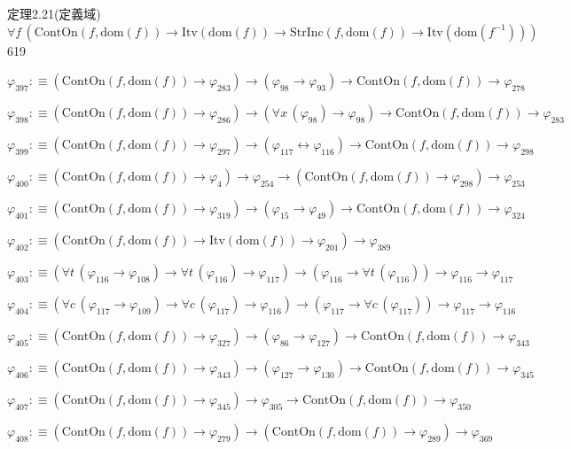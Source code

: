 \begin{fullproof}{定理2.21(定義域)}{$\forall f\,(\mathrm{ContOn}(f,\mathrm{dom}(f)) \to \mathrm{Itv}(\mathrm{dom}(f)) \to \mathrm{StrInc}(f,\mathrm{dom}(f)) \to \mathrm{Itv}(\mathrm{dom}(f^{-1})))$}{619}
\begin{abbrevlist}
\item $\varphi_{397} :\equiv (\mathrm{ContOn}(f,\mathrm{dom}(f)) \to \varphi_{283}) \to (\varphi_{98} \to \varphi_{93}) \to \mathrm{ContOn}(f,\mathrm{dom}(f)) \to \varphi_{278}$
\item $\varphi_{398} :\equiv (\mathrm{ContOn}(f,\mathrm{dom}(f)) \to \varphi_{286}) \to (\forall x\,(\varphi_{98}) \to \varphi_{98}) \to \mathrm{ContOn}(f,\mathrm{dom}(f)) \to \varphi_{283}$
\item $\varphi_{399} :\equiv (\mathrm{ContOn}(f,\mathrm{dom}(f)) \to \varphi_{297}) \to (\varphi_{117} \leftrightarrow \varphi_{116}) \to \mathrm{ContOn}(f,\mathrm{dom}(f)) \to \varphi_{298}$
\item $\varphi_{400} :\equiv (\mathrm{ContOn}(f,\mathrm{dom}(f)) \to \varphi_{4}) \to \varphi_{254} \to (\mathrm{ContOn}(f,\mathrm{dom}(f)) \to \varphi_{298}) \to \varphi_{253}$
\item $\varphi_{401} :\equiv (\mathrm{ContOn}(f,\mathrm{dom}(f)) \to \varphi_{319}) \to (\varphi_{15} \to \varphi_{49}) \to \mathrm{ContOn}(f,\mathrm{dom}(f)) \to \varphi_{324}$
\item $\varphi_{402} :\equiv (\mathrm{ContOn}(f,\mathrm{dom}(f)) \to \mathrm{Itv}(\mathrm{dom}(f)) \to \varphi_{201}) \to \varphi_{389}$
\item $\varphi_{403} :\equiv (\forall t\,(\varphi_{116} \to \varphi_{108}) \to \forall t\,(\varphi_{116}) \to \varphi_{117}) \to (\varphi_{116} \to \forall t\,(\varphi_{116})) \to \varphi_{116} \to \varphi_{117}$
\item $\varphi_{404} :\equiv (\forall c\,(\varphi_{117} \to \varphi_{109}) \to \forall c\,(\varphi_{117}) \to \varphi_{116}) \to (\varphi_{117} \to \forall c\,(\varphi_{117})) \to \varphi_{117} \to \varphi_{116}$
\item $\varphi_{405} :\equiv (\mathrm{ContOn}(f,\mathrm{dom}(f)) \to \varphi_{327}) \to (\varphi_{86} \to \varphi_{127}) \to \mathrm{ContOn}(f,\mathrm{dom}(f)) \to \varphi_{343}$
\item $\varphi_{406} :\equiv (\mathrm{ContOn}(f,\mathrm{dom}(f)) \to \varphi_{343}) \to (\varphi_{127} \to \varphi_{130}) \to \mathrm{ContOn}(f,\mathrm{dom}(f)) \to \varphi_{345}$
\item $\varphi_{407} :\equiv (\mathrm{ContOn}(f,\mathrm{dom}(f)) \to \varphi_{345}) \to \varphi_{305} \to \mathrm{ContOn}(f,\mathrm{dom}(f)) \to \varphi_{350}$
\item $\varphi_{408} :\equiv (\mathrm{ContOn}(f,\mathrm{dom}(f)) \to \varphi_{279}) \to (\mathrm{ContOn}(f,\mathrm{dom}(f)) \to \varphi_{289}) \to \varphi_{369}$

\end{abbrevlist}
\end{fullproof}
